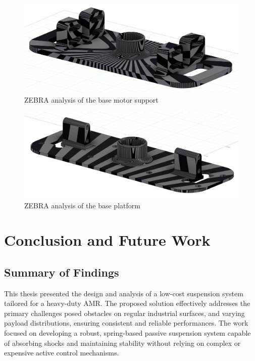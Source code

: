 \documentclass[11pt]{article}
\begin{document}
\begin{figure}[H]
    \centering
    \includegraphics[width=\textwidth]{images/ZEBRA/baseMotorSupport.png}
    \caption{ZEBRA analysis of the base motor support}
    \label{fig:zebra_base_motor_support}
\end{figure}

\begin{figure}[H]
    \centering
    \includegraphics[width=\textwidth]{images/ZEBRA/basePlatform.png}
    \caption{ZEBRA analysis of the base platform}
    \label{fig:zebra_base_platform}
\end{figure}

   
\newpage

\section{Conclusion and Future Work}
\subsection{Summary of Findings}
This thesis presented the design and analysis of a low-cost suspension system tailored for a heavy-duty AMR. The proposed solution effectively addresses the primary challenges posed obstacles on regular industrial surfaces, and varying payload distributions, ensuring consistent and reliable performances. The work focused on developing a robust, spring-based passive suspension system capable of absorbing shocks and maintaining stability without relying on complex or expensive active control mechanisms.
\end{document}

